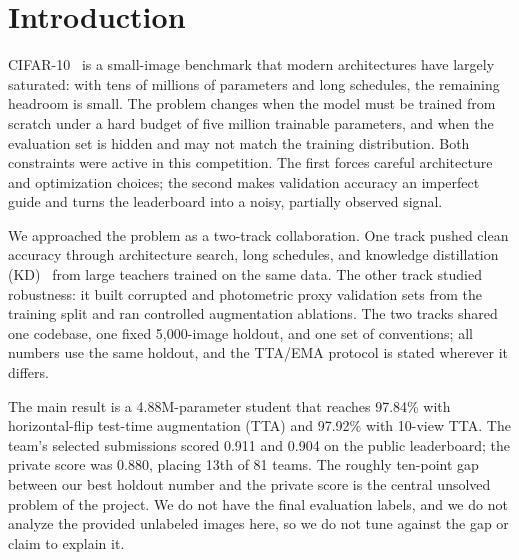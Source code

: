 \section{Introduction}

CIFAR-10~\citep{krizhevsky2009} is a small-image benchmark that modern architectures have largely
saturated: with tens of millions of parameters and long schedules, the remaining
headroom is small. The problem changes when the model must be trained from
scratch under a hard budget of five million trainable parameters, and when the
evaluation set is hidden and may not match the training distribution. Both
constraints were active in this competition. The first forces careful
architecture and optimization choices; the second makes validation accuracy an
imperfect guide and turns the leaderboard into a noisy, partially observed
signal.

We approached the problem as a two-track collaboration. One track pushed clean
accuracy through architecture search, long schedules, and knowledge distillation
(KD)~\citep{hinton2015distilling} from large teachers trained on the same data. The other track studied
robustness: it built corrupted and photometric proxy validation sets from the
training split and ran controlled augmentation ablations. The two tracks shared
one codebase, one fixed 5,000-image holdout, and one set of conventions; all numbers use
the same holdout, and the TTA/EMA protocol is stated wherever it differs.

The main result is a 4.88M-parameter student that reaches 97.84\% with
horizontal-flip test-time augmentation (TTA) and 97.92\% with 10-view TTA. The
team's selected submissions scored 0.911 and 0.904 on the public leaderboard;
the private score was 0.880, placing 13th of 81 teams. The roughly ten-point gap between our
best holdout number and the private score is the central unsolved problem of the
project. We do not have the final evaluation labels, and we do not analyze the
provided unlabeled images here, so we do not tune against the gap or claim to
explain it.

